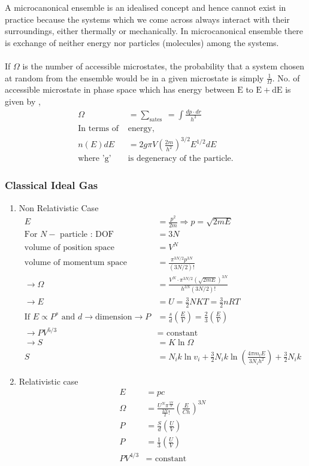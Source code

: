 A microcanonical ensemble is an idealised concept and hence cannot exist in practice because the systems which we come across always interact with their surroundings, either thermally or mechanically.
In microcanonical ensemble there is exchange of neither energy nor particles (molecules) among the systems.
\\\\If $\Omega$ is the number of accessible microstates, the probability that a system chosen at random from the ensemble would be in a given microstate is simply $\frac{1}{\Omega}$.
No. of accessible microstate in phase space which has energy between $\mathrm{E}$ to $\mathrm{E}+\mathrm{dE}$ is given by ,
\begin{align*}
\Omega&=\sum_{\text {sates }}=\int \frac{d p \cdot d r}{h^{3}}\\
\text{In terms of }&\text{energy,}\\
n(E) d E&=2 g \pi V\left(\frac{2 m}{h^{2}}\right)^{3 / 2} E^{1 / 2} d E\\
\text{where '$\mathrm{g}$' }&\text{is degeneracy of the particle.}
\end{align*} 
\subsubsection{Classical Ideal Gas }
\begin{enumerate}[label=\alph*)]
	\item  Non Relativistic Case
	\begin{align*}
	E&=\frac{p^{2}}{2 m} \Rightarrow p=\sqrt{2 m E}\\
	\text{For }N-\text{ particle : DOF }&=3 N\\
	\text{volume of position space }&=V^{N}\\
	\text{volume of momentum space }&=\frac{\pi^{3 N / 2} p^{3 N}}{(3 N / 2) !}\\
	\rightarrow \Omega&=\frac{V^{N} \cdot \pi^{3 N / 2}(\sqrt{2 m E})^{3 N}}{h^{3 N}(3 N / 2) !}\\
	\rightarrow E&=U=\frac{3}{2} N K T=\frac{3}{2} n R T \\
	\text{If }E\propto P^s \text{ and }d \rightarrow\text{dimension}
	\rightarrow P&=\frac{s}{d}\left(\frac{E}{V}\right)=\frac{2}{3}\left(\frac{E}{V}\right) \\
	\rightarrow P V^{5 / 3}&=\text { constant } \\
	\rightarrow S&=K \ln \Omega\\
	S&=N_{i} k \ln v_{i}+\frac{3}{2} N_{i} k \ln \left(\frac{4 \pi m_{i} E}{3 N_{i} h^{2}}\right)+\frac{3}{2} N_{i} k
	\end{align*}
	\item  Relativistic case
	\begin{align*}
	E&=pc\\
	\Omega&=\frac{U^N\pi^\frac{3N}{2}}{\frac{3N}{2}!}\left(\frac{E}{C h}\right)^{3 N}\\
	P&=\frac{S}{d}\left(\frac{U}{V} \right) \\
	P&=\frac{1}{3}\left(\frac{U}{V}\right)\\
	P V^{4 / 3}&=\text { constant }
	\end{align*}
\end{enumerate}
